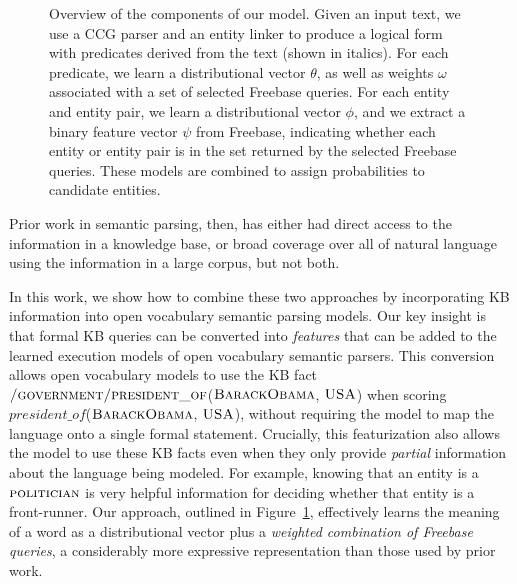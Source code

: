 \documentclass[11pt,letterpaper]{article}
\newcommand{\figref}[1]{Figure~\ref{fig:#1}}
\newcommand{\lexicalpredicate}[1]{\ensuremath{\textit{#1}}}
\newcommand{\formalpredicate}[1]{{\small \ensuremath{\textsc{#1}}}}
\begin{document}
\begin{figure}[ht]

\caption{Overview of the components of our model.  Given an input text, we use a CCG parser and
an entity linker to produce a logical form with predicates derived from the text (shown in
italics).  For each predicate, we learn a distributional vector $\theta$, as well as weights
$\omega$ associated with a set of selected Freebase queries.  For each entity and entity pair, we
learn a distributional vector $\phi$, and we extract a binary feature vector $\psi$ from
Freebase, indicating whether each entity or entity pair is in the set returned by the selected
Freebase queries.  These models are combined to assign probabilities to candidate entities.}
\label{fig:overview}
\end{figure}

Prior work in semantic parsing, then, has either had direct access to the information in a
knowledge base, or broad coverage over all of natural language using the information in a large
corpus, but not both.

In this work, we show how to combine these two approaches by incorporating KB information into open
vocabulary semantic parsing models.  Our key insight is that formal KB queries can be converted
into \emph{features} that can be added to the learned execution models of open vocabulary semantic
parsers.  This conversion allows open vocabulary models to use the KB fact
\formalpredicate{/government/president\_of}(\formalpredicate{BarackObama}, \formalpredicate{USA})
when scoring \lexicalpredicate{president\_of}(\formalpredicate{BarackObama},
\formalpredicate{USA}), without requiring the model to map the language onto a single formal
statement.  Crucially, this featurization also allows the model to use these KB facts even when
they only provide \emph{partial} information about the language being modeled.  For example,
knowing that an entity is a \formalpredicate{politician} is very helpful information for deciding
whether that entity is a front-runner.  Our approach, outlined in \figref{overview}, effectively
learns the meaning of a word as a distributional vector plus a \emph{weighted combination of
Freebase queries}, a considerably more expressive representation than those used by prior work.
\end{document}
